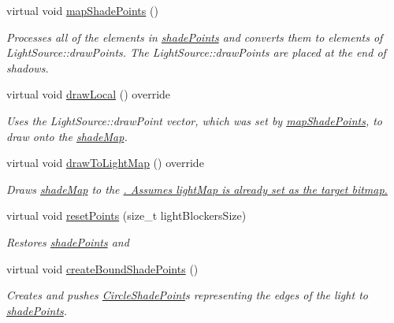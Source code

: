 \begin{DoxyCompactItemize}
virtual void \hyperlink{classlighting_1_1CircleLightSource_aea43f0005a2ffbc50e8898e2e967693b}{map\+Shade\+Points} ()
\begin{DoxyCompactList}\small\item\em Processes all of the elements in \hyperlink{classlighting_1_1CircleLightSource_acdfea64be9d142f669338c5e206e753e}{shade\+Points} and converts them to elements of Light\+Source\+::draw\+Points. The Light\+Source\+::draw\+Points are placed at the end of shadows. \end{DoxyCompactList}\item 
virtual void \hyperlink{classlighting_1_1CircleLightSource_a6ab6f8f8eaf003e52ac2c86d88496c77}{draw\+Local} () override
\begin{DoxyCompactList}\small\item\em Uses the Light\+Source\+::draw\+Point vector, which was set by \hyperlink{classlighting_1_1CircleLightSource_aea43f0005a2ffbc50e8898e2e967693b}{map\+Shade\+Points}, to draw onto the \hyperlink{classlighting_1_1CircleLightSource_a382414c9318853e93c85bc64bcd19f4e}{shade\+Map}. \end{DoxyCompactList}\item 
virtual void \hyperlink{classlighting_1_1CircleLightSource_ab0f9107c09ae9c6966bab14538505894}{draw\+To\+Light\+Map} () override
\begin{DoxyCompactList}\small\item\em Draws \hyperlink{classlighting_1_1CircleLightSource_a382414c9318853e93c85bc64bcd19f4e}{shade\+Map} to the \hyperlink{}{. Assumes light\+Map is already set as the target bitmap. } \end{DoxyCompactList}\item 
virtual void \hyperlink{classlighting_1_1CircleLightSource_a3bdcfaba7976f0cd3399f89ecd635524}{reset\+Points} (size\+\_\+t light\+Blockers\+Size)
\begin{DoxyCompactList}\small\item\em Restores \hyperlink{classlighting_1_1CircleLightSource_acdfea64be9d142f669338c5e206e753e}{shade\+Points} and \end{DoxyCompactList}\item 
virtual void \hyperlink{classlighting_1_1CircleLightSource_a357178ac79b3cadaead529e5e37e2cce}{create\+Bound\+Shade\+Points} ()
\begin{DoxyCompactList}\small\item\em Creates and pushes \hyperlink{classlighting_1_1CircleShadePoint}{Circle\+Shade\+Point}s representing the edges of the light to \hyperlink{classlighting_1_1CircleLightSource_acdfea64be9d142f669338c5e206e753e}{shade\+Points}. \end{DoxyCompactList}\item 

\end{DoxyCompactItemize}
